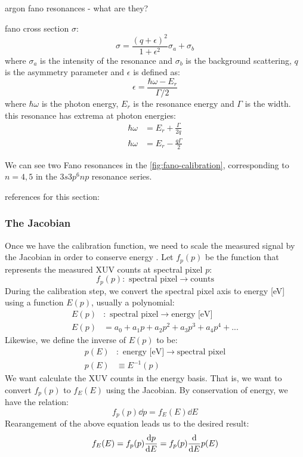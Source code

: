 argon fano resonances - what are they?

fano cross section $\sigma$:
\begin{equation}
\sigma = \frac{(q+\epsilon)^2}{1+\epsilon^2} \sigma_a + \sigma_b
\end{equation}
where $\sigma_a$ is the intensity of the resonance and $\sigma_b$ is the background scattering, $q$ is the asymmetry parameter and $\epsilon$ is defined as:
\begin{equation}
\epsilon = \frac{\hbar \omega - E_r}{\Gamma/2}
\end{equation}
where $\hbar \omega$ is the photon energy, $E_r$ is the resonance energy and $\Gamma$ is the width. this resonance has extrema at photon energies:
\begin{align}
\hbar \omega &= E_r + \frac{\Gamma}{2 q} \\
\hbar \omega &= E_r - \frac{q \Gamma}{2}
\end{align}

We can see two Fano resonances in the \cref{fig:fano-calibration}, corresponding to $n=4,5$ in the $3s3p^6np$ resonance series.

references for this section: \cite{sorensenArgon3sAutoionization1994,caretteMulticonfigurationalHartreeFockClosecoupling2013}

\subsubsection{The Jacobian}
\label{sec:jacobian}

Once we have the calibration function, we need to scale the measured signal by the Jacobian in order to conserve energy \cite{mooneyGetBasicsRight2013}. Let $f_p(p)$ be the function that represents the measured XUV counts at spectral pixel $p$:
\begin{equation}
f_p(p): \textrm{ spectral pixel} \rightarrow \textrm{counts}
\end{equation}
During the calibration step, we convert the spectral pixel axis to energy [eV] using a function $E(p)$, usually a polynomial:
\begin{align}
E(p)&: \textrm{ spectral pixel} \rightarrow \textrm{energy [eV]} \\
E(p) &= a_0 + a_1 p + a_2 p^2 + a_3 p^3 + a_4 p^4 + ...
\end{align}
Likewise, we define the inverse of $E(p)$ to be:
\begin{align}
p(E)&: \textrm{ energy [eV]} \rightarrow \textrm{spectral pixel} \\
p(E) &\equiv E^{-1}(p)
\end{align}
We want calculate the XUV counts in the energy basis. That is, we want to convert $f_p(p)$ to $f_E(E)$ using the Jacobian. By conservation of energy, we have the relation:
\begin{equation}
f_p (p) \dd{p} = f_E (E) \dd{E}
\end{equation}
Rearangement of the above equation leads us to the desired result:
\begin{equation}
f_E (E) = f_p (p) \dv{p}{E} = f_p (p) \dv{E} p(E)
\end{equation}
